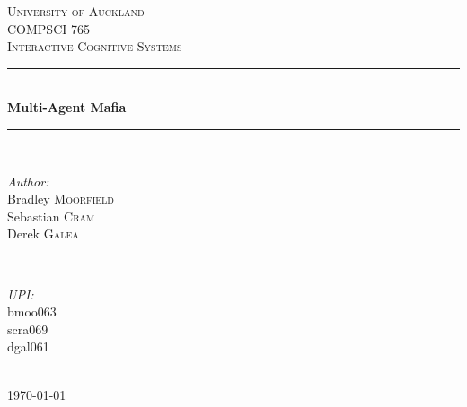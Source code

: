 \documentclass[12pt]{article} %
\begin{document}

\begin{titlepage}

\newcommand{\HRule}{\rule{\linewidth}{0.5mm}} %

\center %

\textsc{\LARGE University of Auckland}\\[1.5cm] %
\textsc{\Large COMPSCI 765}\\[0.5cm] %
\textsc{\large Interactive Cognitive Systems}\\[0.5cm] %

\HRule \\[0.4cm]
{ \huge \bfseries Multi-Agent Mafia}\\[0.4cm] %
\HRule \\[1.5cm]

\begin{minipage}{0.4\textwidth}
\begin{flushleft} \large
\emph{Author:}\\
Bradley \textsc{Moorfield}\\
Sebastian \textsc{Cram}\\
Derek \textsc{Galea}\\
\end{flushleft}
\end{minipage}
~
\begin{minipage}{0.4\textwidth}
\begin{flushright} \large
\emph{UPI:}\\
bmoo063\\
scra069\\
dgal061\\
\end{flushright}
\end{minipage}\\[4cm]

{\large \today}\\[3cm] %


\vfill %

\end{titlepage}
\end{document}
